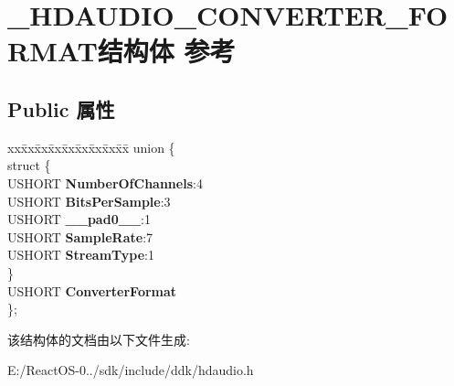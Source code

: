 \hypertarget{struct___h_d_a_u_d_i_o___c_o_n_v_e_r_t_e_r___f_o_r_m_a_t}{}\section{\+\_\+\+H\+D\+A\+U\+D\+I\+O\+\_\+\+C\+O\+N\+V\+E\+R\+T\+E\+R\+\_\+\+F\+O\+R\+M\+A\+T结构体 参考}
\label{struct___h_d_a_u_d_i_o___c_o_n_v_e_r_t_e_r___f_o_r_m_a_t}
\subsection*{Public 属性}
\begin{DoxyCompactItemize}
\item 
\mbox{\label{struct___h_d_a_u_d_i_o___c_o_n_v_e_r_t_e_r___f_o_r_m_a_t_add59b8285d44ab4b8febf25a97b43110}} 
\begin{tabbing}
xx\=xx\=xx\=xx\=xx\=xx\=xx\=xx\=xx\=\kill
union \{\\
\mbox{\label{union___h_d_a_u_d_i_o___c_o_n_v_e_r_t_e_r___f_o_r_m_a_t_1_1_0D1677_a0ddf3f740ebe27d2d8bfe96a2f414c57}} 
\>struct \{\\
\>\>USHORT {\bfseries NumberOfChannels}:4\\
\>\>USHORT {\bfseries BitsPerSample}:3\\
\>\>USHORT {\bfseries \_\_pad0\_\_}:1\\
\>\>USHORT {\bfseries SampleRate}:7\\
\>\>USHORT {\bfseries StreamType}:1\\
\>\} \\
\>USHORT {\bfseries ConverterFormat}\\
\}; \\

\end{tabbing}\end{DoxyCompactItemize}


该结构体的文档由以下文件生成\+:\begin{DoxyCompactItemize}
\item 
E\+:/\+React\+O\+S-\/0../sdk/include/ddk/hdaudio.\+h\end{DoxyCompactItemize}

